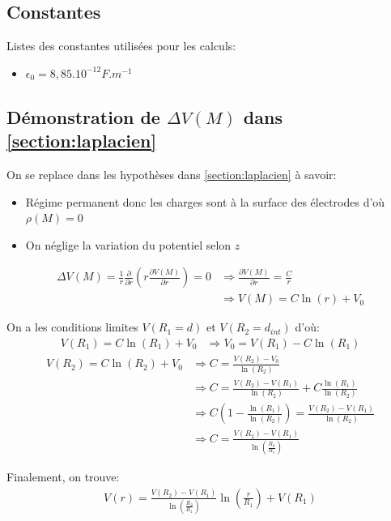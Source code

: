 \documentclass[12pt]{article}
\begin{document}
	\subsection*{Constantes}
	Listes des constantes utilisées pour les calculs:
	\begin{itemize}
		\item $\epsilon_0 = 8,85.10^{-12} F.m^{-1}$
	\end{itemize}

	\subsection*{Démonstration de $\Delta V(M)$ dans \ref{section:laplacien}}
	\label{section:demonstration_laplacien}
	On se replace dans les hypothèses dans \ref{section:laplacien} à savoir:

	\begin{itemize}
		\item Régime permanent donc les charges sont à la surface des électrodes d'où $\rho (M) = 0$
		\item On néglige la variation du potentiel selon $z$
	\end{itemize}

	\begin{align*}
		\Delta V(M) = \frac{1}{r} \frac{\partial}{\partial r} \left( r \frac{\partial V(M)}{\partial r} \right) = 0 & \Rightarrow \frac{\partial V(M)}{\partial r} = \frac{C}{r} \\
		& \Rightarrow V(M) = C \ln(r) + V_0
	\end{align*}
	
	On a les conditions limites $V(R_1 = d)$ et $V(R_2 = d_{int})$ d'où:
	\begin{align*}
		V(R_1) = C \ln(R_1) + V_0 & \Rightarrow V_0 = V(R_1) - C \ln(R_1)
	\end{align*}
	\begin{align*}
		V(R_2) = C \ln(R_2) + V_0 & \Rightarrow C = \frac{V(R_2) - V_0}{\ln(R_2)} \\
		& \Rightarrow C = \frac{V(R_2) - V(R_1)}{\ln(R_2)} + C\frac{\ln(R_1)}{\ln(R_2)} \\
		& \Rightarrow C \left( 1 - \frac{\ln(R_1)}{\ln(R_2)}\right) = \frac{V(R_2) - V(R_1)}{\ln(R_2)} \\
		& \Rightarrow C = \frac{V(R_2) - V(R_1)}{\ln(\frac{R_2}{R_1})}
	\end{align*}

	Finalement, on trouve:
	\begin{align}
		\label{eqn:potentiel}
		V(r) = \frac{V(R_2) - V(R_1)}{\ln(\frac{R_2}{R_1})} \ln\left(\frac{r}{R_1}\right) + V(R_1)
	\end{align}
	
\end{document}
